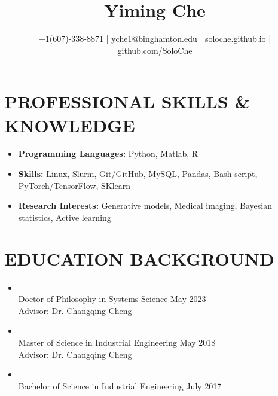 \documentclass[10pt]{article}
\title{\bf  Yiming Che \vspace{-0.6em}}
\author{+1(607)-338-8871 | yche1@binghamton.edu | soloche.github.io | github.com/SoloChe}
\date{}
\begin{document}
	\maketitle

\vspace{-5em}

\section*{PROFESSIONAL SKILLS \& KNOWLEDGE}
 \begin{itemize}	
 	\item {\bf Programming Languages:} Python, Matlab, R
 	\item {\bf Skills:} Linux, Slurm, Git/GitHub, MySQL, Pandas, Bash script, PyTorch/TensorFlow, SKlearn
 	\item {\bf Research Interests:} Generative models, Medical imaging, Bayesian statistics, Active learning
 \end{itemize}

\section*{EDUCATION BACKGROUND}
\begin{itemize}
		\item {}                                                           
		\\Doctor of Philosophy in Systems Science \hfill May 2023 
		\\Advisor: Dr. Changqing Cheng

	\item {}                                                           
	\\Master of Science in Industrial Engineering \hfill  May 2018\\
	Advisor: Dr. Changqing Cheng
	
    \item {}
            \\Bachelor of Science in Industrial Engineering \hfill July 2017 
\end{itemize}
\end{document}
